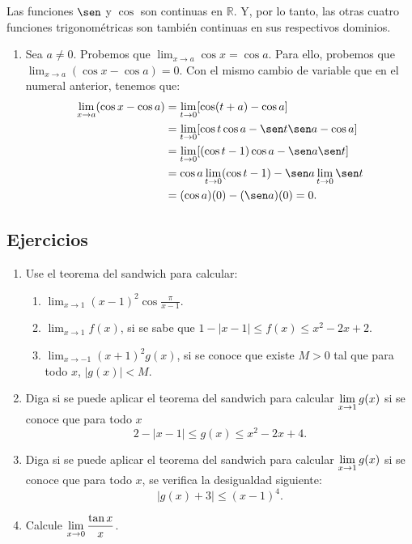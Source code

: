\begin{exemplo}[Solución]{
Las funciones $\sen$ y $\cos$ son continuas en $\mathbb{R}$. Y, por lo tanto, las otras cuatro
funciones trigonométricas son también continuas en sus respectivos dominios. }
\begin{enumerate}[leftmargin=*]
\item Sea $a\neq 0$. Probemos que
$\displaystyle
\lim_{x\to a}\cos x=\cos a.
$
Para ello, probemos que
$\displaystyle
\lim_{x\to a}(\cos x- \cos a)=0.
$
Con el mismo cambio de variable que en el numeral anterior, tenemos que:
\begin{align*}
\lim_{x\to a}(\cos x- \cos a) & = \lim_{t\to 0}[\cos (t+a)- \cos a] \\
& = \lim_{t\to 0}[\cos t \cos a -\sen t \sen a- \cos a]  \\
& = \lim_{t\to 0}[(\cos t-1) \cos a -\sen a\sen t ]  \\
& = \cos a \lim_{t\to 0}(\cos t -1) -\sen a \lim_{t\to 0}\sen t \\
&= (\cos a)(0)-(\sen a)(0) = 0.
\end{align*}

\end{enumerate}
\end{exemplo}

\subsection{Ejercicios}
\begingroup
\small
\begin{multicols}{2}
\begin{enumerate}[leftmargin=*]
\item Use el teorema del sandwich para calcular:
            \begin{enumerate}
            \item $\displaystyle \lim_{x\to 1}(x-1)^2\cos\frac{\pi}{x-1}$.
             \item $\displaystyle \lim_{x\to 1}f(x)$, si se sabe que $1-|x-1|\leq f(x)\leq
                 x^2-2x+2$.
             \item $\displaystyle \lim_{x\to -1}(x+1)^2g(x)$, si se conoce que existe $M>0$
                 tal que para todo $x$, $|g(x)|<M$.
             \end{enumerate}
\item Diga si se puede aplicar el teorema del sandwich para calcular $\displaystyle\limjc{g(x)}{x}{1}$ si se
    conoce que para todo $x$
\[
2-|x-1|\leq g(x)\leq x^2-2x+4.
\]
\item Diga si se puede aplicar el teorema del sandwich para calcular $\displaystyle\limjc{g(x)}{x}{1}$ si se conoce que para todo $x$, se verifica la desigualdad siguiente:
\[
|g(x)+3|\leq (x-1)^4.
\]

\item Calcule $\displaystyle \limjc{\frac{\tan x}{x}}{x}{0}$.
\end{enumerate}
\end{multicols}
\endgroup

